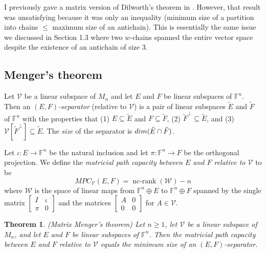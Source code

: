 \documentclass[10pt,a4paper]{amsart}
\newtheorem{thm}{Theorem}[section]
\newcommand\ncrank{\operatorname{nc-rank}}
\begin{document}
I previously gave a matrix version of Dilworth's theorem in \cite[Theorem 6.8]{weaver}. However, that result was unsatisfying because it was only an inequality (minimum size of a partition into chains $\leq$ maximum size of an antichain). This is essentially the same issue we discussed in Section 1.3 where two $w$-chains spanned the entire vector space despite the existence of an antichain of size 3.

\subsection{Menger's theorem}

Let $\mathcal{V}$ be a linear subspace of $M_n$ and let $E$ and $F$ be linear subspaces of $\mathbb{F}^n$. Then an {\it $(E,F)$-separator} (relative to $\mathcal{V}$) is a pair of linear subspaces $\tilde{E}$ and $\tilde{F}$ of $\mathbb{F}^n$ with the properties that (1) $E \subseteq \tilde{E}$ and $F \subseteq \tilde{F}$, (2) $\tilde{F}^\perp \subseteq \tilde{E}$, and (3) $\mathcal{V}[\tilde{F}^\perp] \subseteq  \tilde{E}$. The {\it size} of the separator is ${\rm dim}(\tilde{E} \cap \tilde{F})$.

Let $\iota: E \to \mathbb{F}^n$ be the natural inclusion and let $\pi: \mathbb{F}^n \to F$ be the orthogonal projection. We define the {\it matricial path capacity between $E$ and $F$ relative to $\mathcal{V}$} to be $$MPC_{\mathcal{V}}(E,F) = \ncrank(\mathcal{W}) - n$$ where $\mathcal{W}$ is the space of linear maps from $\mathbb{F}^n \oplus E$ to $\mathbb{F}^n \oplus F$ spanned by the single matrix $\left[\begin{matrix}I&\iota\\ \pi&0\end{matrix}\right]$ and the matrices $\left[\begin{matrix}A&0\\0&0\end{matrix}\right]$ for $A \in \mathcal{V}$.


\begin{thm}\label{mmt} (Matrix Menger's theorem)
Let $n \geq 1$, let $\mathcal{V}$ be a linear subspace of $M_n$, and let $E$ and $F$ be linear subspaces of $\mathbb{F}^n$. Then the matricial path capacity between $E$ and $F$ relative to $\mathcal{V}$ equals the minimum size of an $(E,F)$-separator.
\end{thm}
\end{document}
